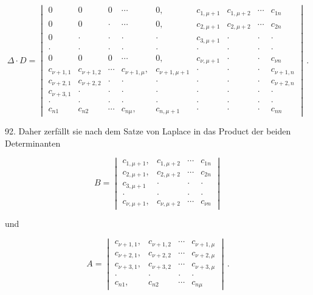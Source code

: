 \documentclass[11pt]{article}
\let\Delta\varDelta
\begin{document}
\[
\Delta\cdot D =
\begin{vmatrix}
0 & 0 & 0 & \cdots & 0, & c_{1,\mu+1} & c_{1,\mu+2} & \cdots & c_{1n} \\
0 & 0 & \cdot & \cdots & 0, & c_{2,\mu+1} & c_{2,\mu+2} & \cdots & c_{2n} \\
0 & \cdot & \cdot & \cdot & \cdot & c_{3,\mu+1} & \cdot & \cdot & \cdot \\
\cdot & \cdot & \cdot & \cdot & \cdot & \cdot & \cdot & \cdot & \cdot \\
0 & 0 & 0 & \cdots & 0, & c_{\nu,\mu+1} & \cdot & \cdot & c_{\nu n} \\
c_{\nu+1,1} & c_{\nu+1,2} & \cdots & c_{\nu+1,\mu}, & c_{\nu+1,\mu+1} & \cdot & \cdot & \cdot & c_{\nu+1,n} \\
c_{\nu+2,1} & c_{\nu+2,2} & \cdot & \cdot & \cdot & \cdot & \cdot & \cdot & c_{\nu+2,n} \\
c_{\nu+3,1} & \cdot & \cdot & \cdot & \cdot & \cdot & \cdot & \cdot & \cdot \\
\cdot & \cdot & \cdot & \cdot & \cdot & \cdot & \cdot & \cdot & \cdot \\
c_{n1} & c_{n2} & \cdots & c_{n\mu}, & c_{n,\mu+1} & \cdot & \cdot & \cdot & c_{nn}
\end{vmatrix}\, .
\]

92. Daher zerfällt sie nach dem Satze von Laplace in das Product der beiden Determinanten

\[
B =
\begin{vmatrix}
c_{1,\mu+1}, & c_{1,\mu+2} & \cdots & c_{1n} \\
c_{2,\mu+1}, & c_{2,\mu+2} & \cdots & c_{2n} \\
c_{3,\mu+1} & \cdot & \cdot & \cdot \\
\cdot & \cdot & \cdot & \cdot \\
c_{\nu,\mu+1}, & c_{\nu,\mu+2} & \cdots & c_{\nu n}
\end{vmatrix}
\]

und

\[
A =
\begin{vmatrix}
c_{\nu+1,1}, & c_{\nu+1,2} & \cdots & c_{\nu+1,\mu} \\
c_{\nu+2,1}, & c_{\nu+2,2} & \cdots & c_{\nu+2,\mu} \\
c_{\nu+3,1}, & c_{\nu+3,2} & \cdots & c_{\nu+3,\mu} \\
\cdot & \cdot & \cdot & \cdot \\
c_{n1}, & c_{n2} & \cdots & c_{n\mu}
\end{vmatrix}\, .
\]
\end{document}
